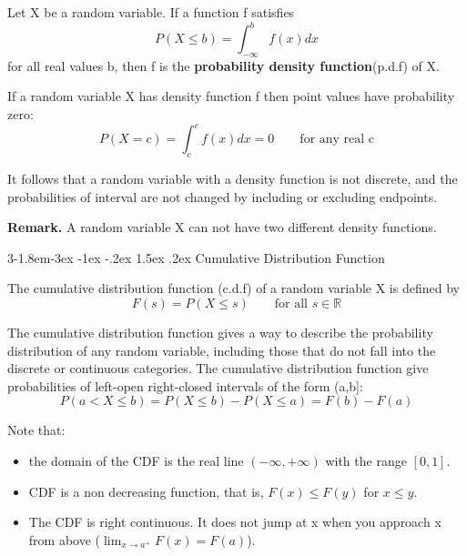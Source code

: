 \documentclass{tufte-handout}
\makeatletter
\renewcommand{\subsection}{\@startsection{subsection}%
    {3}{-1.8em}{-3ex \@plus -1ex \@minus -.2ex}%
    {1.5ex \@plus .2ex}
    {\hspace*{-5.5em}\fcolorbox{ltblue}{ltblue}{\parbox[c][1.0ex][b]{4em}{\phantom{space}}}
    \normalfont\large\itshape\color{ltblue}}}
\makeatother
\begin{document}

    \begin{Definition}
        Let X be a random variable. If a function f satisfies 
        \[P(X \leq b ) = \int_{-\infty}^{b}f(x)dx\]
        for all real values b, then f is the \textbf{probability density function}(p.d.f) of X.
    \end{Definition}

    
    \begin{Theorem}
        If a random variable X has density function f then point values have probability zero:
        \[P(X=c) = \int_{c }^{c }f(x)dx = 0 \qquad \text{for any real c}\]
    \end{Theorem}
    It follows that a random variable with a density function is not discrete, and the 
    probabilities of interval are not changed by including or excluding endpoints.

    \textbf{Remark.} A random variable X can not have two different density functions.

    \subsection{Cumulative Distribution Function}
    \begin{Definition}
        The cumulative distribution function (c.d.f) of a random variable X is defined by
        \[F(s) = P(X \leq s) \qquad \text{for all } s \in \mathbb{R}\]
    \end{Definition}
    
    The cumulative distribution function gives a way to describe the probability distribution of any 
    random variable, including those that do not fall into the discrete or continuous categories.
    The cumulative distribution function give probabilities of left-open right-closed intervals of the form (a,b]:
    \[P(a < X \leq b) = P(X \leq b) - P(X \leq a) = F(b) - F(a)\]

    Note that:
    \begin{itemize}
        \item the domain of the CDF is the real line \( (-\infty, +\infty) \) with the range \([0,1]\).
        \item CDF is a non decreasing function, that is, \( F(x) \leq F(y) \) for \( x \leq y \).
        \item The CDF is right continuous. It does not jump at x when you approach x from above (\( \lim_{x \to a^+} F(x) = F(a) \)).

    \end{itemize}
    
\end{document}
